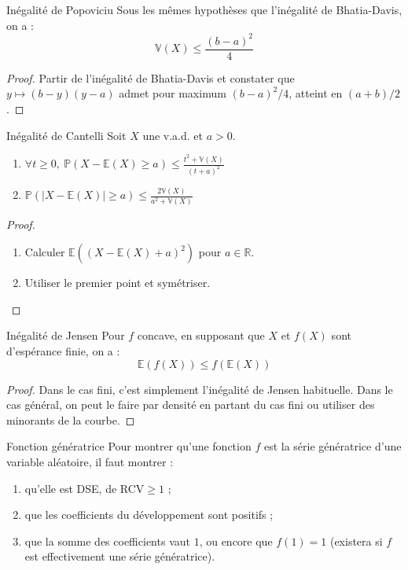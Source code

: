 \documentclass[french]{book}
\renewcommand{\P}{\mathbb{P}}
\newcommand{\R}{\mathbb{R}}
\newcommand{\E}{\mathbb{E}}
\newcommand{\V}{\mathbb{V}}
\theoremstyle{plain}
\theoremstyle{definition}
\theoremstyle{remark}
\begin{document}
\begin{AS}{Inégalité de Popoviciu}
	Sous les mêmes hypothèses que l'inégalité de Bhatia-Davis, on a : $$\V(X)\leqslant\frac{(b-a)^2}{4}$$
\end{AS}
\begin{proof}
	Partir de l'inégalité de Bhatia-Davis et constater que $y\mapsto (b-y)(y-a)$ admet pour maximum $(b-a)^2/4$, atteint en $(a+b)/2$.
\end{proof}

\begin{AS}{Inégalité de Cantelli}
	Soit $X$ une v.a.d. et $a>0$.
	\begin{enumerate}
		\item $\forall t\geqslant0,\ \P(X-\E(X)\geqslant a)\leqslant\displaystyle\frac{t^2+\V(X)}{(t+a)^2}$
		\item $\P(\lvert X-\E(X)\rvert\geqslant a)\leqslant\displaystyle\frac{2\V(X)}{a^2+\V(X)}$
	\end{enumerate}
\end{AS}
\begin{proof}
	\begin{enumerate}
		\item Calculer $\E((X-\E(X)+a)^2)$ pour $a\in\R$.
		\item Utiliser le premier point et symétriser.
	\end{enumerate}
\end{proof}

\begin{AS}{Inégalité de Jensen}
	Pour $f$ concave, en supposant que $X$ et $f(X)$ sont d'espérance finie, on a : $$\E(f(X))\leqslant f(\E(X))$$
\end{AS}
\begin{proof}
	Dans le cas fini, c'est simplement l'inégalité de Jensen habituelle. Dans le cas général, on peut le faire par densité en partant du cas fini ou utiliser des minorants de la courbe. 
\end{proof}

\begin{AS}{Fonction génératrice} Pour montrer qu'une fonction $f$ est la série génératrice d'une variable aléatoire, il faut montrer :
\begin{enumerate}
	\item qu'elle est DSE, de RCV$\geqslant1$ ;
	\item que les coefficients du développement sont positifs ;
	\item que la somme des coefficients vaut $1$, ou encore que $f(1)=1$ (existera si $f$ est effectivement une série génératrice).
\end{enumerate}
\end{AS}
\end{document}
